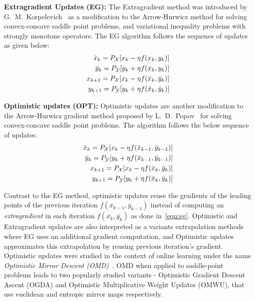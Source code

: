 \textbf{Extragradient Updates (EG):}
The Extragradient method was introduced by G.~M.~Korpelevich~\cite{korpelevichextragradient1976} as
a modification to the Arrow-Hurwicz method for solving convex-concave saddle point problems, and
variational inequality problems with strongly monotone operators.
The EG algorithm follows the sequence of updates as given below: %
\begin{equation}
	\label{eqn:eg}
	\begin{split}
		\bar{x}_{k} = P_{\mathcal{X}}[x_k - \eta f(x_k, y_k)] \\ 
		\bar{y}_{k} = P_{\mathcal{Y}}[y_k + \eta f(x_k, y_k)] \\ 
		x_{k+1} = P_{\mathcal{X}}[x_k - \eta f(\bar{x}_k, \bar{y}_k)] \\ 
		y_{k+1} = P_{\mathcal{Y}}[y_k + \eta f(\bar{x}_k, \bar{y}_k)]
	\end{split}
\end{equation}

\textbf{Optimistic updates (OPT):} Optimistic updates are another modification
to the Arrow-Hurwicz gradient method proposed by L.~D.~Popov~\cite{popovmodification1980} for
solving convex-concave saddle point problems.
The algorithm follows the below sequence of updates: %
\begin{equation}
	\label{eqn:opt}
	\begin{split}
		\bar{x}_{k} = P_{\mathcal{X}}[x_k - \eta f(\bar{x}_{k-1}, \bar{y}_{k-1})] \\ 
		\bar{y}_{k} = P_{\mathcal{Y}}[y_k + \eta f(\bar{x}_{k-1}, \bar{y}_{k-1})] \\ 
		x_{k+1} = P_{\mathcal{X}}[x_k - \eta f(\bar{x}_k, \bar{y}_k)] \\
		y_{k+1} = P_{\mathcal{Y}}[y_k + \eta f(\bar{x}_k, \bar{y}_k)]
	\end{split}
\end{equation}

Contrast to the EG method, optimistic updates reuse the gradients of the leading points of the
previous iteration $f(\bar{x}_{k-1}, \bar{y}_{k-1})$ instead of computing an \textit{extragradient}
in each iteration $f(\bar{x_{k}}, \bar{y_{k}})$ as done in~\ref{eqn:eg}.
Optimistic and Extragradient updates are also interpreted as a variants extrapolation methods where
EG uses an additional gradient computation, and Optimistic updates approximates this extrapolation
by reusing previous iteration's gradient.
Optimistic updates were studied in the context of online learning under the name \textit{Optimistic
	Mirror Descent (OMD)}~\cite{rakhlinOptimization2013}.
OMD when applied to saddle-point problems leads to two popularly studied variants - Optimistic
Gradient Descent Ascent (OGDA) and Optimistic Multiplicative Weight Updates (OMWU), that use
euclidean and entropic mirror maps respectively.

